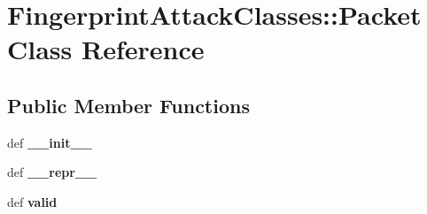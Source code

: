 \hypertarget{classFingerprintAttackClasses_1_1Packet}{
\section{FingerprintAttackClasses::Packet Class Reference}
\label{classFingerprintAttackClasses_1_1Packet}
}
\subsection*{Public Member Functions}
\begin{CompactItemize}
\item 
\hypertarget{classFingerprintAttackClasses_1_1Packet_7f2eb840faf0439a757f00d9d3007824}{
def \textbf{\_\-\_\-init\_\-\_\-}}
\label{classFingerprintAttackClasses_1_1Packet_7f2eb840faf0439a757f00d9d3007824}

\item 
\hypertarget{classFingerprintAttackClasses_1_1Packet_73ff1f7884ea2ebef60ff17f3d2c6e89}{
def \textbf{\_\-\_\-repr\_\-\_\-}}
\label{classFingerprintAttackClasses_1_1Packet_73ff1f7884ea2ebef60ff17f3d2c6e89}

\item 
\hypertarget{classFingerprintAttackClasses_1_1Packet_c7a7c7345323ef1933b168c28474d080}{
def \textbf{valid}}
\label{classFingerprintAttackClasses_1_1Packet_c7a7c7345323ef1933b168c28474d080}

\end{CompactItemize}
